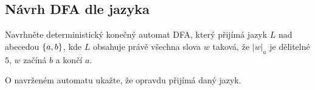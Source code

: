 
\subsection{Návrh DFA dle jazyka}
Navrhněte deterministický konečný automat DFA, který přijímá jazyk $L$ nad abecedou $\left\lbrace a,b \right\rbrace$, kde $L$ obsahuje právě
všechna slova $w$ taková, že $|w|_a$ je dělitelné $5$, $w$ začíná $b$ a končí $a$.

\noindent
O navrženém automatu ukažte, že opravdu přijímá daný jazyk.


